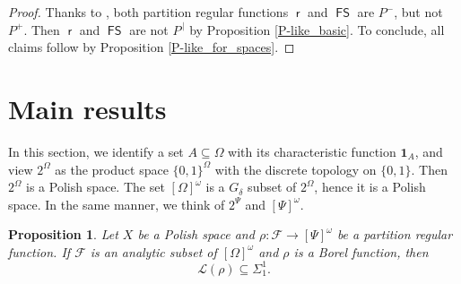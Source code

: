 \documentclass{amsart}
\theoremstyle{plain}
\newtheorem{prop}[thm]{Proposition}
\theoremstyle{definition}
\theoremstyle{remark}
\newcommand{\cF}{\mathcal{F}}
\newcommand{\F}{\cF}
\DeclareMathOperator{\FS}{\mathsf{FS}}
\DeclareMathOperator{\rr}{\mathsf{r}}
\begin{document}
\begin{proof}
Thanks to \cite[Proposition 6.7]{FKK23}, both partition regular functions $\rr$ and $\FS$ are $P^-$, but not $P^+$. Then $\rr$ and $\FS$ are not $P^{\,|}$ by Proposition \ref{P-like_basic}. To conclude, all claims follow by Proposition \ref{P-like_for_spaces}.
\end{proof}



\section{Main results}\label{sec:mainresults}

In this section, we 
identify a set $A\subseteq\Omega$  with its characteristic function $\mathbf 1_A$,
and 
view $2^\Omega$  as  the product space $\{0,1\}^\Omega$ with the discrete topology on $\{0,1\}$. Then $2^\Omega$ is a Polish space. The set  $[\Omega]^\omega$ is a $G_\delta$ subset of $ 2^\Omega$, hence it is a  Polish space.
In the same manner, we think of  
$2^\Psi$ and $[\Psi]^\omega$.

\begin{prop}
\label{continous_implies_analytic}
Let $X$ be a Polish space and  
$\rho:\mathcal F\to[\Psi]^\omega$
be a partition regular function.
If $\F$ is an analytic subset of $[\Omega]^\omega$ and $\rho$ is a Borel function, then 
\begin{equation*}
    \mathscr{L}(\rho)\subseteq \Sigma^1_1.
\end{equation*}
\end{prop}
\end{document}
